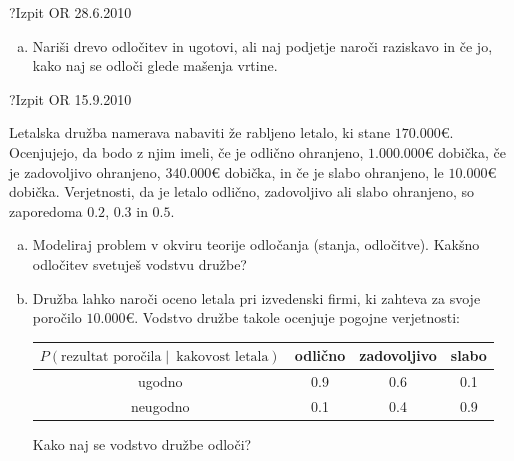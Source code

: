 \begin{naloga}{?}{Izpit OR 28.6.2010}
\begin{vprasanje}[bp]
\begin{enumerate}[(a)]
\item Nariši drevo odločitev in ugotovi,
ali naj podjetje naroči raziskavo in če jo,
kako naj se odloči glede mašenja vrtine.
\end{enumerate}
\end{vprasanje}
\begin{odgovor}
\end{odgovor}
\end{naloga}


\begin{naloga}{?}{Izpit OR 15.9.2010}
\begin{vprasanje}
Letalska družba namerava nabaviti že rabljeno letalo, ki stane $170.000 €$.
Ocenjujejo, da bodo z njim imeli,
če je odlično ohranjeno, $1.000.000 €$ dobička,
če je zadovoljivo ohranjeno, $340.000 €$ dobička,
in če je slabo ohranjeno, le $10.000 €$ dobička.
Verjetnosti, da je letalo odlično, zadovoljivo ali slabo ohranjeno,
so zaporedoma $0.2$, $0.3$ in $0.5$.
\begin{enumerate}[(a)]
\item Modeliraj problem v okviru teorije odločanja (stanja, odločitve).
Kakšno odločitev svetuješ vodstvu družbe?

\item Družba lahko naroči oceno letala pri izvedenski firmi,
ki zahteva za svoje poročilo $10.000 €$.
Vodstvo družbe takole ocenjuje pogojne verjetnosti:
\begin{center}
\begin{tabular}{c|ccc}
$P(\text{rezultat poročila} \;|\;\ \text{kakovost letala})$
& odlično & zadovoljivo & slabo \\ \hline
ugodno & 0.9 & 0.6 & 0.1 \\
neugodno & 0.1 & 0.4 & 0.9
\end{tabular}
\end{center}
Kako naj se vodstvo družbe odloči?
\end{enumerate}

\end{vprasanje}
\begin{odgovor}
\end{odgovor}
\end{naloga}


